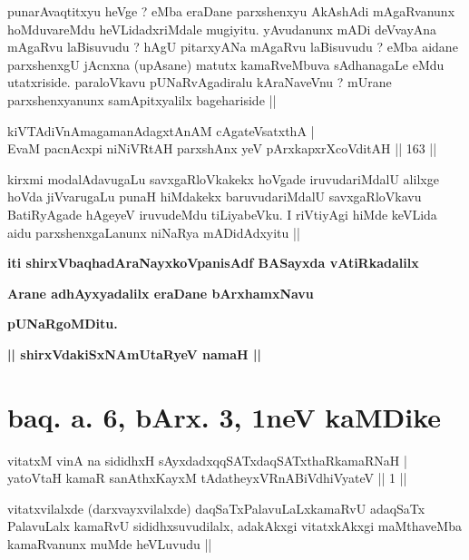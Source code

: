 \begin{artha}
punarAvaqtitxyu heVge ? eMba eraDane parxshenxyu AkAshAdi mAgaRvanunx hoMduvareMdu heVLidadxriMdale mugiyitu. yAvudanunx mADi deVvayAna mAgaRvu laBisuvudu ? hAgU pitarxyANa mAgaRvu laBisuvudu ? eMba aidane parxshenxgU jAcnxna (upAsane) matutx kamaRveMbuva sAdhanagaLe eMdu utatxriside. paraloVkavu pUNaRvAgadiralu kAraNaveVnu ? mUrane parxshenxyanunx samApitxyalilx bagehariside ||
\end{artha}


\begin{shl}
kiVTAdiVnAmagamanAdagxtAnAM cA\s \s gateVsatxthA | \\
EvaM pacnAcxpi niNiVRtAH parxshAnx yeV pArxkapxrXcoVditAH \hfill|| 163 || 
\end{shl}

\begin{artha}
kirxmi modalAdavugaLu savxgaRloVkakekx hoVgade iruvudariMdalU alilxge hoVda jiVvarugaLu punaH hiMdakekx baruvudariMdalU savxgaRloVkavu BatiRyAgade hAgeyeV iruvudeMdu tiLiyabeVku. I riVtiyAgi hiMde keVLida aidu parxshenxgaLanunx niNaRya mADidAdxyitu ||
\end{artha}


\begin{center}
{\bf iti shirxVbaqhadAraNayxkoVpanisAdf BASayxda vAtiRkadalilx}
\smallskip

{\bf Arane adhAyxyadalilx eraDane bArxhamxNavu}
\smallskip

{\bf pUNaRgoMDitu.}

\smallskip
{\bf || shirxVdakiSxNAmUtaRyeV namaH ||}
\end{center}

\section*{baq. a. 6, bArx. 3, 1neV kaMDike}


\begin{shl}
vitatxM vinA na sididhxH sAyxdadxqqSATxdaqSATxthaRkamaRNaH | \\
yatoV\s taH kamaR sanAthxKayxM tAdatheyxVRnABiVdhiVyateV \hfill|| 1 || 
\end{shl}

\begin{artha}
vitatxvilalxde (darxvayxvilalxde) daqSaTxPalavuLaLxkamaRvU adaqSaTx PalavuLalx kamaRvU sididhxsuvudilalx, adakAkxgi vitatxkAkxgi maMthaveMba kamaRvanunx muMde heVLuvudu ||
\end{artha}

